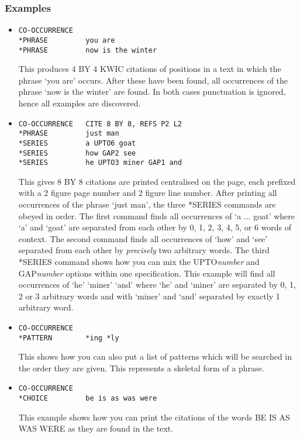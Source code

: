 \subsubsection{Examples}
\begin{itemize}
\item
\begin{verbatim}
CO-OCCURRENCE
*PHRASE         you are
*PHRASE         now is the winter
\end{verbatim}
    This produces 4 BY 4 KWIC citations of positions in a text in
    which the phrase `you are' occurs.  After these have been found, all
    occurrences of the phrase `now is the winter' are found.  In both
    cases punctuation is ignored, hence all examples are discovered.
\item
\begin{verbatim}
CO-OCCURRENCE   CITE 8 BY 8, REFS P2 L2
*PHRASE         just man
*SERIES         a UPTO6 goat
*SERIES         how GAP2 see
*SERIES         he UPTO3 miner GAP1 and
\end{verbatim}
    This gives 8 BY 8 citations are printed centralised on the page, each
    prefixed with a 2 figure page number and 2 figure line number.  After
    printing all occurrences of the phrase `just man', the three *SERIES
    commands are obeyed in order.  The first command finds all occurrences
    of `a ... goat' where `a' and `goat' are separated from each other by
    0, 1, 2, 3, 4, 5, or 6 words of context.  The second command finds all
    occurrences of `how' and `see' separated from each other by {\em precisely}
    two arbitrary words.  The third *SERIES command shows how you can mix
    the UPTO{\em number} and GAP{\em number} options within one specification.
    This example will find all occurrences of `he' `miner' `and' where `he'
    and `miner' are separated by 0, 1, 2 or 3 arbitrary words and with
    `miner' and `and' separated by exactly 1 arbitrary word.
\item
\begin{verbatim}
CO-OCCURRENCE
*PATTERN        *ing *ly
\end{verbatim}
    This shows how you can also put a list of patterns which will be
    searched in the order they are given. This represents a skeletal form
    of a phrase.
\item
\begin{verbatim}
CO-OCCURRENCE
*CHOICE         be is as was were
\end{verbatim}
    This example shows how you can print the citations of the words BE IS
    AS WAS WERE as they are found in the text. 
\end{itemize}

